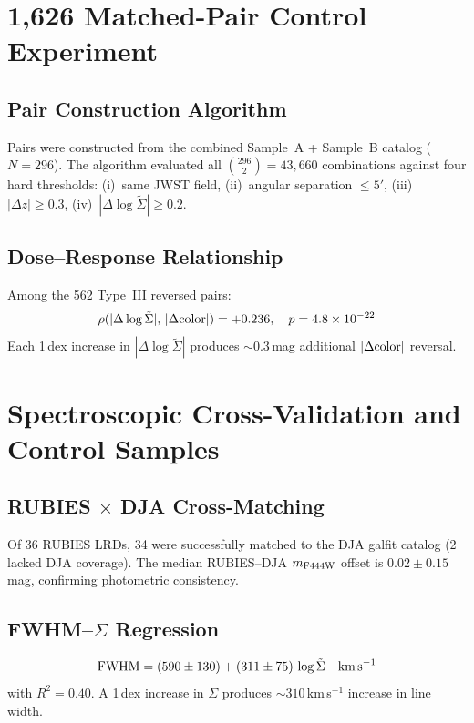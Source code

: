 \documentclass[apj,twocolumn,longbibliography,linenumbers]{aastex701}
\begin{document}
\section{1,626 Matched-Pair Control Experiment}

\subsection{Pair Construction Algorithm}

Pairs were constructed from the combined Sample~A + Sample~B catalog ($N = 296$). The algorithm evaluated all $\binom{296}{2} = 43{,}660$ combinations against four hard thresholds: (i)~same JWST field, (ii)~angular separation $\leq 5'$, (iii)~$|\Delta z| \geq 0.3$, (iv)~$|\Delta\log\tilde\Sigma| \geq 0.2$.

\subsection{Dose--Response Relationship}

Among the 562 Type~III reversed pairs:
\begin{equation}
\rho(|\Delta\log\tilde\Sigma|,\, |\Delta{\rm color}|) = +0.236, \quad p = 4.8 \times 10^{-22}
\end{equation}
Each 1\,dex increase in $|\Delta\log\tilde\Sigma|$ produces ${\sim}0.3$\,mag additional $|\Delta{\rm color}|$ reversal.

\section{Spectroscopic Cross-Validation and Control Samples}

\subsection{RUBIES $\times$ DJA Cross-Matching}

Of 36 RUBIES LRDs, 34 were successfully matched to the DJA galfit catalog (2 lacked DJA coverage). The median RUBIES--DJA $m_{\rm F444W}$ offset is $0.02 \pm 0.15$\,mag, confirming photometric consistency.

\subsection{FWHM--$\Sigma$ Regression}

\begin{equation}
{\rm FWHM} = (590 \pm 130) + (311 \pm 75)\,\log\tilde\Sigma \quad {\rm km\,s^{-1}}
\end{equation}
with $R^2 = 0.40$. A 1\,dex increase in $\Sigma$ produces ${\sim}310$\,km\,s$^{-1}$ increase in line width.
\end{document}
